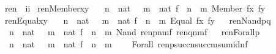 \begin{isabelle}
\isamarkuptrue%
\isamarkupfalse%
\ ren\ {\isacharcolon}{\isacharcolon}\ {\isachardoublequoteopen}i{\isacharequal}{\isachargreater}i{\isachardoublequoteclose}\isanewline
{}\isamarkupfalse%
\isanewline
\ {\isachardoublequoteopen}ren{\isacharparenleft}Member{\isacharparenleft}x{\isacharcomma}y{\isacharparenright}{\isacharparenright}\ {\isacharequal}\isanewline
\ \ {\isacharparenleft}{\isasymlambda}n\ {\isasymin}\ nat\ {\isachardot}\ {\isasymlambda}\ m\ {\isasymin}\ nat{\isachardot}\ {\isasymlambda}f\ {\isasymin}\ n\ {\isasymrightarrow}\ m{\isachardot}\ Member\ {\isacharparenleft}f{\isacharbackquote}x{\isacharcomma}\ f{\isacharbackquote}y{\isacharparenright}{\isacharparenright}{\isachardoublequoteclose}\isanewline
\ \isanewline
\ {\isachardoublequoteopen}ren{\isacharparenleft}Equal{\isacharparenleft}x{\isacharcomma}y{\isacharparenright}{\isacharparenright}\ {\isacharequal}\isanewline
\ \ {\isacharparenleft}{\isasymlambda}n\ {\isasymin}\ nat\ {\isachardot}\ {\isasymlambda}\ m\ {\isasymin}\ nat{\isachardot}\ {\isasymlambda}f\ {\isasymin}\ n\ {\isasymrightarrow}\ m{\isachardot}\ Equal\ {\isacharparenleft}f{\isacharbackquote}x{\isacharcomma}\ f{\isacharbackquote}y{\isacharparenright}{\isacharparenright}{\isachardoublequoteclose}\isanewline
\ \isanewline
\ {\isachardoublequoteopen}ren{\isacharparenleft}Nand{\isacharparenleft}p{\isacharcomma}q{\isacharparenright}{\isacharparenright}\ {\isacharequal}\isanewline
\ \ {\isacharparenleft}{\isasymlambda}n\ {\isasymin}\ nat\ {\isachardot}\ {\isasymlambda}\ m\ {\isasymin}\ nat{\isachardot}\ {\isasymlambda}f\ {\isasymin}\ n\ {\isasymrightarrow}\ m{\isachardot}\ 
Nand\ {\isacharparenleft}ren{\isacharparenleft}p{\isacharparenright}{\isacharbackquote}n{\isacharbackquote}m{\isacharbackquote}f{\isacharcomma}\ ren{\isacharparenleft}q{\isacharparenright}{\isacharbackquote}n{\isacharbackquote}m{\isacharbackquote}f{\isacharparenright}{\isacharparenright}{\isachardoublequoteclose}\isanewline
\ \isanewline
\ {\isachardoublequoteopen}ren{\isacharparenleft}Forall{\isacharparenleft}p{\isacharparenright}{\isacharparenright}\ {\isacharequal}\isanewline
\ \  {\isacharparenleft}{\isasymlambda}n\ {\isasymin}\ nat\ {\isachardot}\ {\isasymlambda}\ m\ {\isasymin}\ nat{\isachardot}\ {\isasymlambda}f\ {\isasymin}\ n\ {\isasymrightarrow}\ m{\isachardot}\ \isanewline
\ \ \ Forall\ {\isacharparenleft}ren{\isacharparenleft}p{\isacharparenright}{\isacharbackquote}succ{\isacharparenleft}n{\isacharparenright}{\isacharbackquote}succ{\isacharparenleft}m{\isacharparenright}{\isacharbackquote}sum{\isacharunderscore}id{\isacharparenleft}n{\isacharcomma}f{\isacharparenright}{\isacharparenright}{\isacharparenright}{\isachardoublequoteclose}
\end{isabelle}

